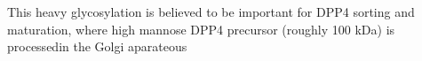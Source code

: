 This heavy glycosylation is believed to be important for DPP4 sorting and maturation, where high mannose DPP4 precursor (roughly 100 kDa) is processedin the Golgi aparateous \cite{Matter_1991}